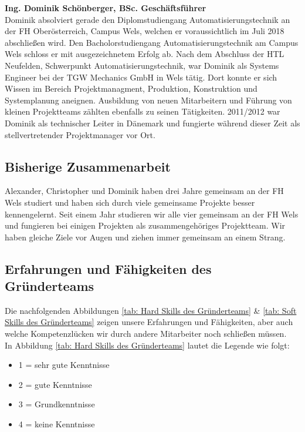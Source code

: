 \textbf{Ing. Dominik Schönberger, BSc. Geschäftsführer} \\
Dominik absolviert gerade den Diplomstudiengang Automatisierungstechnik an der FH Oberösterreich, Campus Wels, welchen er voraussichtlich im Juli 2018 abschließen wird. Den Bacholorstudiengang Automatisierungstechnik am Campus Wels schloss er mit ausgezeichnetem Erfolg ab.  Nach dem Abschluss der HTL Neufelden, Schwerpunkt Automatisierungstechnik, war Dominik als Systems Engineer bei der TGW Mechanics GmbH in Wels tätig. Dort konnte er sich Wissen im Bereich Projektmanagment, Produktion, Konstruktion und Systemplanung aneignen. Ausbildung von neuen Mitarbeitern und Führung von kleinen Projektteams zählten ebenfalls zu seinen Tätigkeiten. 2011/2012 war Dominik als technischer Leiter in Dänemark und fungierte während dieser Zeit als stellvertretender Projektmanager vor Ort.\\

\subsection{Bisherige Zusammenarbeit}
Alexander, Christopher und Dominik haben drei Jahre gemeinsam an der FH Wels studiert und haben sich durch viele gemeinsame Projekte besser kennengelernt. Seit einem Jahr studieren wir alle vier gemeinsam an der FH Wels und fungieren bei einigen Projekten als zusammengehöriges Projektteam. Wir haben gleiche Ziele vor Augen und ziehen immer gemeinsam an einem Strang. 


\subsection{Erfahrungen und Fähigkeiten des Gründerteams}
Die nachfolgenden Abbildungen \ref{tab: Hard Skills des Gründerteams} \& \ref{tab: Soft Skills des Gründerteams} zeigen unsere Erfahrungen und Fähigkeiten, aber auch welche Kompetenzlücken wir durch andere Mitarbeiter noch schließen müssen. \\
\newpage
In Abbildung \ref{tab: Hard Skills des Gründerteams} lautet die Legende wie folgt: 
\begin{itemize}
	\item 1 = sehr gute Kenntnisse
	\item 2 = gute Kenntnisse
	\item 3 = Grundkenntnisse
	\item 4 = keine Kenntnisse \\\\ 
\end{itemize}

